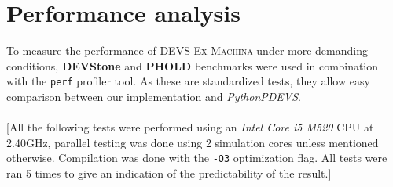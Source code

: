 \documentclass[8pt,a4paper]{report}
\begin{document}
\chapter{Performance analysis}
To measure the performance of \textsc{DEVS Ex Machina} under more demanding conditions, \textbf{DEVStone} and \textbf{PHOLD} benchmarks were used in combination with the \texttt{perf} profiler tool. As these are standardized tests, they allow easy comparison between our implementation and \textit{PythonPDEVS}.\\
\\
{\footnotesize[All the following tests were performed using an \textit{Intel Core i5 M520} CPU at 2.40GHz, parallel testing was done using 2 simulation cores unless mentioned otherwise. Compilation was done with the \texttt{-O3} optimization flag. All tests were ran 5 times to give an indication of the predictability of the result.]}

\pagebreak
\end{document}
